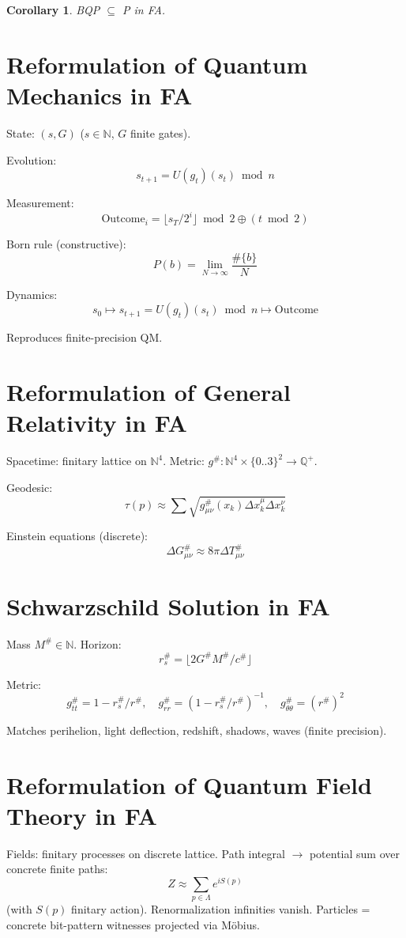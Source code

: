 \documentclass[11pt]{article}
\theoremstyle{plain}
\newtheorem{corollary}[theorem]{Corollary}
\begin{document}
\begin{corollary}
BQP $\subseteq$ P in FA.
\end{corollary}

\section{Reformulation of Quantum Mechanics in FA}
State: $(s,G)$ ($s\in\mathbb{N}$, $G$ finite gates).

Evolution:
\[
s_{t+1}=U(g_t)(s_t)\bmod n
\]

Measurement:
\[
\text{Outcome}_i=\lfloor s_T/2^i\rfloor\bmod2\oplus(t\bmod2)
\]

Born rule (constructive):
\[
P(b)=\lim_{N\to\infty}\frac{\#\{b\}}{N}
\]

Dynamics:
\[
s_0\mapsto s_{t+1}=U(g_t)(s_t)\bmod n\mapsto\text{Outcome}
\]

Reproduces finite-precision QM.

\section{Reformulation of General Relativity in FA}
Spacetime: finitary lattice on $\mathbb{N}^4$. Metric: $g^\#:\mathbb{N}^4\times\{0..3\}^2\to\mathbb{Q}^+$.

Geodesic:
\[
\tau(p)\approx\sum\sqrt{g^\#_{\mu\nu}(x_k)\Delta x_k^\mu\Delta x_k^\nu}
\]

Einstein equations (discrete):
\[
\Delta G^\#_{\mu\nu}\approx8\pi\Delta T^\#_{\mu\nu}
\]

\section{Schwarzschild Solution in FA}
Mass $M^\#\in\mathbb{N}$. Horizon:
\[
r_s^\#=\lfloor2G^\#M^\#/c^\#\rfloor
\]

Metric:
\[
g^\#_{tt}=1-r_s^\#/r^\#,\quad g^\#_{rr}=(1-r_s^\#/r^\#)^{-1},\quad g^\#_{\theta\theta}=(r^\#)^2
\]

Matches perihelion, light deflection, redshift, shadows, waves (finite precision).

\section{Reformulation of Quantum Field Theory in FA}
Fields: finitary processes on discrete lattice. Path integral $\to$ potential sum over concrete finite paths:
\[
Z \approx \sum_{p \in \Lambda} e^{iS(p)}
\]
(with $S(p)$ finitary action). Renormalization infinities vanish. Particles = concrete bit-pattern witnesses projected via Möbius.
\end{document}
